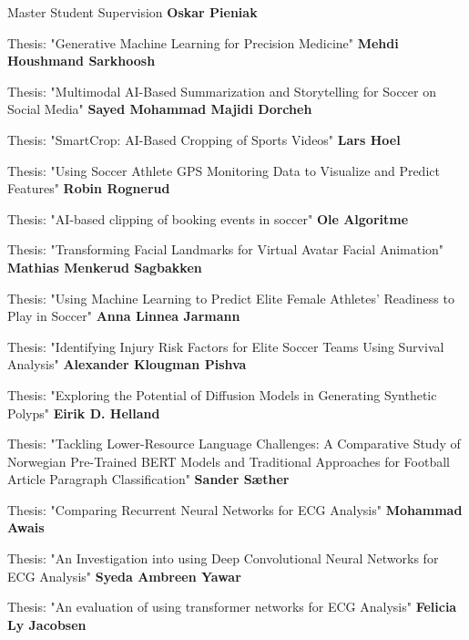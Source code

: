 \begin{rubric}{Master Student Supervision}
    \entry*[2024]%
    \textbf{Oskar Pieniak} \par
    Thesis: "Generative Machine Learning for Precision Medicine"
    \entry*[2024]%
    \textbf{Mehdi Houshmand Sarkhoosh} \par
    Thesis: "Multimodal AI-Based Summarization and Storytelling for Soccer on Social Media"
    \entry*[2024]%
    \textbf{Sayed Mohammad Majidi Dorcheh} \par
    Thesis: "SmartCrop: AI-Based Cropping of Sports Videos"
    \entry*[2023]%
    \textbf{Lars Hoel} \par
    Thesis: "Using Soccer Athlete GPS Monitoring Data to Visualize and Predict Features"
    \entry*[2023]%
    \textbf{Robin Rognerud} \par
    Thesis: "AI-based clipping of booking events in soccer"
    \entry*[2023]%
    \textbf{Ole Algoritme} \par
    Thesis: "Transforming Facial Landmarks for Virtual Avatar Facial Animation"
    \entry*[2023]%
    \textbf{Mathias Menkerud Sagbakken} \par
    Thesis: "Using Machine Learning to Predict Elite Female Athletes' Readiness to Play in Soccer"
    \entry*[2023]%
    \textbf{Anna Linnea Jarmann} \par
    Thesis: "Identifying Injury Risk Factors for Elite Soccer Teams Using Survival Analysis"
    \entry*[2023]%
    \textbf{Alexander Klougman Pishva} \par
    Thesis: "Exploring the Potential of Diffusion Models in Generating Synthetic Polyps"
    \entry*[2023]%
    \textbf{Eirik D. Helland} \par
    Thesis: "Tackling Lower-Resource Language Challenges: A Comparative Study of Norwegian Pre-Trained BERT Models and Traditional Approaches for Football Article Paragraph Classification"
    \entry*[2023]%
    \textbf{Sander Sæther} \par
    Thesis: "Comparing Recurrent Neural Networks for ECG Analysis"
    \entry*[2023]%
    \textbf{Mohammad Awais} \par
    Thesis: "An Investigation into using Deep Convolutional Neural Networks for ECG Analysis"
    \entry*[2023]%
    \textbf{Syeda Ambreen Yawar} \par
    Thesis: "An evaluation of using transformer networks for ECG Analysis"
    \entry*[2022]%
    \textbf{Felicia Ly Jacobsen} \par

\end{rubric}
